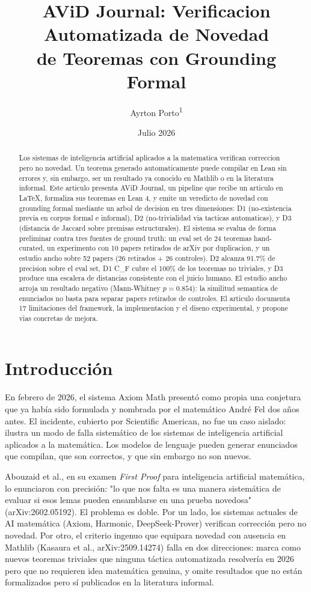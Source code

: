 \documentclass[12pt,a4paper]{article}
\title{AViD Journal: Verificacion Automatizada de Novedad \\ de Teoremas con Grounding Formal}
\author{Ayrton Porto\textsuperscript{1}}
\date{Julio 2026}
\theoremstyle{remark}
\begin{document}
\maketitle

\begin{abstract}
Los sistemas de inteligencia artificial aplicados a la matematica verifican correccion pero no novedad. Un teorema generado automaticamente puede compilar en Lean sin errores y, sin embargo, ser un resultado ya conocido en Mathlib o en la literatura informal. Este articulo presenta AViD Journal, un pipeline que recibe un articulo en LaTeX, formaliza sus teoremas en Lean 4, y emite un veredicto de novedad con grounding formal mediante un arbol de decision en tres dimensiones: D1 (no-existencia previa en corpus formal e informal), D2 (no-trivialidad via tacticas automaticas), y D3 (distancia de Jaccard sobre premisas estructurales). El sistema se evalua de forma preliminar contra tres fuentes de ground truth: un eval set de 24 teoremas hand-curated, un experimento con 10 papers retirados de arXiv por duplicacion, y un estudio ancho sobre 52 papers (26 retirados + 26 controles). D2 alcanza 91.7\% de precision sobre el eval set, D1 C\_F cubre el 100\% de los teoremas no triviales, y D3 produce una escalera de distancias consistente con el juicio humano. El estudio ancho arroja un resultado negativo (Mann-Whitney $p = 0.854$): la similitud semantica de enunciados no basta para separar papers retirados de controles. El articulo documenta 17 limitaciones del framework, la implementacion y el diseno experimental, y propone vias concretas de mejora.
\end{abstract}
\section{Introducción}

En febrero de 2026, el sistema Axiom Math presentó como propia una conjetura que ya había sido formulada y nombrada por el matemático André Fel dos años antes. El incidente, cubierto por Scientific American, no fue un caso aislado: ilustra un modo de falla sistemático de los sistemas de inteligencia artificial aplicados a la matemática. Los modelos de lenguaje pueden generar enunciados que compilan, que son correctos, y que sin embargo no son nuevos.


Abouzaid et al., en su examen \textit{First Proof} para inteligencia artificial matemática, lo enunciaron con precisión: "lo que nos falta es una manera sistemática de evaluar si esos lemas pueden ensamblarse en una prueba novedosa" (arXiv:2602.05192). El problema es doble. Por un lado, los sistemas actuales de AI matemática (Axiom, Harmonic, DeepSeek-Prover) verifican corrección pero no novedad. Por otro, el criterio ingenuo que equipara novedad con ausencia en Mathlib (Kasaura et al., arXiv:2509.14274) falla en dos direcciones: marca como nuevos teoremas triviales que ninguna táctica automatizada resolvería en 2026 pero que no requieren idea matemática genuina, y omite resultados que no están formalizados pero sí publicados en la literatura informal.
\end{document}
